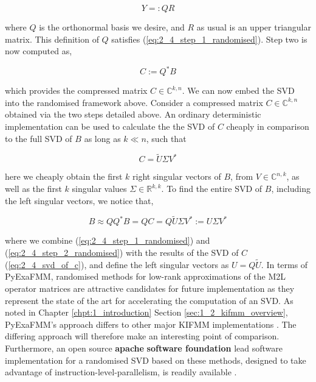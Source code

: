 \begin{equation}
    Y =: QR
\end{equation}

where $Q$ is the orthonormal basis we desire, and $R$ as usual is an upper triangular
matrix. This definition of $Q$ satisfies (\ref{eq:2_4_step_1_randomised}). Step two
is now computed as,

\begin{equation}
    C := Q^* B
    \label{eq:2_4_step_2_randomised}
\end{equation}

which provides the compressed matrix $C \in \mathbb{C}^{k, n}$.
We can now embed the \gls{SVD} into the randomised framework above. Consider a compressed matrix
$C \in \mathbb{C}^{k, n}$ obtained via the two steps detailed above. An
ordinary deterministic implementation can be used to calculate the
the \gls{SVD} of $C$ cheaply in comparison to the full SVD of $B$ as long as
$k \ll n$, such that

\begin{equation}
    C = \tilde{U}\Sigma V^*
    \label{eq:2_4_svd_of_c}
\end{equation}

here we cheaply obtain the first $k$ right singular vectors of $B$,
from $V \in \mathbb{C}^{n, k}$, as well as the first $k$ singular values
$\Sigma \in \mathbb{R}^{k, k}$. To find the entire \gls{SVD} of $B$, including the
left singular vectors, we notice that,

\begin{equation}
    B \approx Q Q^* B = QC = Q \tilde{U} \Sigma V^* := U\Sigma V^*
\end{equation}

where we combine (\ref{eq:2_4_step_1_randomised}) and (\ref{eq:2_4_step_2_randomised})
with the results of the \gls{SVD} of $C$ (\ref{eq:2_4_svd_of_c}), and define the
left singular vectors as $U = Q \tilde{U}$. In terms of \gls{PyExaFMM}, randomised
methods for low-rank approximations of the M2L operator matrices are attractive candidates
for future implementation as they represent the state of the art for accelerating the computation of an \gls{SVD}.
As noted in Chapter \ref{chpt:1_introduction} Section \ref{sec:1_2_kifmm_overview},
\gls{PyExaFMM}'s approach differs to other major \gls{KIFMM} implementations \cite{Malhotra:2015:CCP,exafmm}.
The differing approach will therefore make an interesting point of comparison. Furthermore,
an open source \textbf{\gls{apache}} \textbf{software foundation} lead software implementation for
a randomised \gls{SVD} based on these methods, designed to take advantage
of \gls{instruction-level-parallelism}, is readily available \cite{mahout}.

